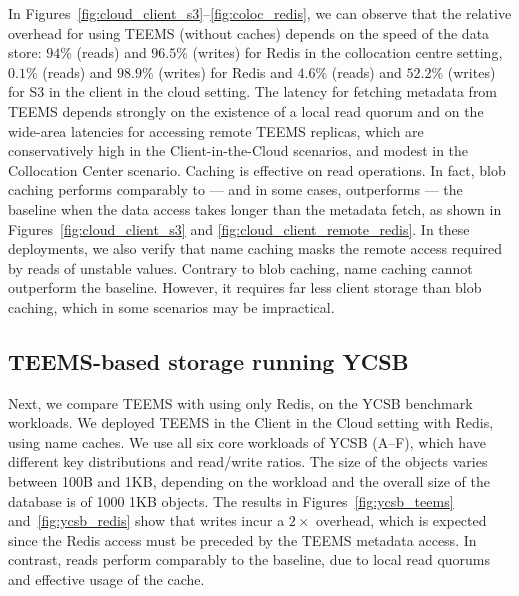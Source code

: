 In Figures~\ref{fig:cloud_client_s3}--\ref{fig:coloc_redis}, we
can observe that the relative overhead for using \ac{TEEMS} (without caches) depends on the speed
of the data store: $94\%$ (reads) and $96.5\%$ (writes) for Redis in
the collocation centre setting, $0.1\%$ (reads) and $98.9\%$ (writes) for Redis
and $4.6\%$ (reads) and $52.2\%$ (writes) for S3 in the client in
the cloud setting.
%
The latency for fetching metadata from \ac{TEEMS} depends strongly on
the existence of a local read quorum and on the wide-area latencies
for accessing remote \ac{TEEMS} replicas, which are conservatively high in the
Client-in-the-Cloud scenarios, and modest in the Collocation Center scenario.
%
Caching is effective on read operations. In fact, blob caching
performs comparably to --- and in some
cases, outperforms --- the baseline when the data
access takes longer than the metadata fetch, as shown in
Figures~\ref{fig:cloud_client_s3} and
\ref{fig:cloud_client_remote_redis}. In these deployments, we also
verify that name caching masks the remote access required by reads of
unstable values. Contrary to blob caching, name caching cannot outperform the
baseline. However, it requires far less client storage than blob
caching, which in some scenarios may be impractical.
\fi

\subsection{\ac{TEEMS}-based storage running \ac{YCSB}}\label{ssec:ycsb}

Next, we compare \ac{TEEMS} with using only
Redis, on the \ac{YCSB} benchmark workloads. We deployed \ac{TEEMS} in the
Client in the Cloud setting with Redis, using name caches. We use all six core workloads
of \ac{YCSB} (A--F), which have different key distributions and read/write
ratios. The size of the objects varies between 100B and 1KB, depending
on the workload and the overall size of the database is of
1000 1KB objects.
%
The results in Figures~\ref{fig:ycsb_teems} and~\ref{fig:ycsb_redis}
show that writes incur a $2\times$ overhead, which is expected since
the Redis access must be preceded by the \ac{TEEMS} metadata access. In
contrast, reads perform comparably to the baseline, due to local
read quorums and effective usage of the cache.


